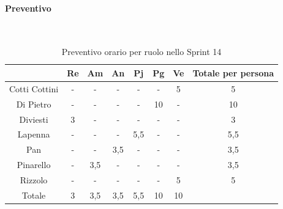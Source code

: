 \documentclass{article}
\begin{document}
                \paragraph{Preventivo}\mbox{}\\
                \begin{table}[H]
                    \centering
                    \begin{tabular}{|c|c|c|c|c|c|c|c|}
                    \hline
                                  & Re  & Am  & An  & Pj  & Pg  & Ve  & Totale per persona \\ \hline
                    Cotti Cottini & -   & -   & -   & -   & -   & 5   & 5                  \\ \hline
                    Di Pietro     & -   & -   & -   & -   & 10  & -   & 10                 \\ \hline
                    Diviesti      & 3   & -   & -   & -   & -   & -   & 3                  \\ \hline
                    Lapenna       & -   & -   & -   & 5,5 & -   & -   & 5,5                \\ \hline
                    Pan           & -   & -   & 3,5 & -   & -   & -   & 3,5                \\ \hline
                    Pinarello     & -   & 3,5 & -   & -   & -   & -   & 3,5                \\ \hline
                    Rizzolo       & -   & -   & -   & -   & -   & 5   & 5                  \\ \hline
                    Totale        & 3   & 3,5 & 3,5 & 5,5 & 10  & 10  &                    \\ \hline
                    \end{tabular}
                    \caption{Preventivo orario per ruolo nello Sprint 14}
                \end{table}

\end{document}
